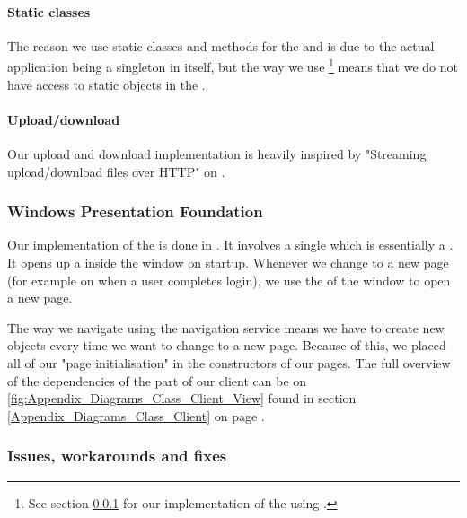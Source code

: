 \paragraph{Static classes}
The reason we use static classes and methods for the  and  is due to the actual application being a singleton in itself, but the way we use \footnote{See section \ref{Implementation_Client_Architecture_WPF} for our implementation of the  using .} means that we do not have access to static objects in the .

\paragraph{Upload/download} Our upload and download implementation is heavily inspired by "Streaming upload/download files over HTTP" on \cite{CODE:UPLDL}. 

\subsubsection{Windows Presentation Foundation}
\label{Implementation_Client_Architecture_WPF}
Our implementation of the  is done in . It involves a single  which is essentially a  . It opens up a  inside the window on startup. Whenever we change to a new page (for example on when a user completes login), we use the  of the window to open a new page.

The way we navigate using the navigation service means we have to create new  objects every time we want to change to a new page. Because of this, we placed all of our "page initialisation" in the constructors of our pages. The full overview of the dependencies of the  part of our client can be on \ref{fig:Appendix_Diagrams_Class_Client_View} found in section \ref{Appendix_Diagrams_Class_Client} on page \pageref{Appendix_Diagrams_Class_Client}.

\subsubsection{Issues, workarounds and fixes}
\label{Implementation_Client_Architecture_Issues}

